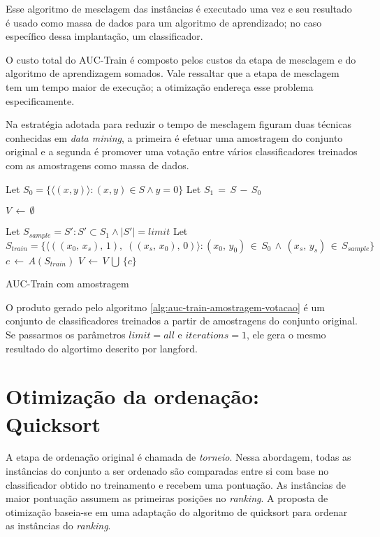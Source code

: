 Esse algoritmo de mesclagem das instâncias é executado uma vez e seu resultado é usado como massa de dados para um algoritmo de aprendizado; no caso específico dessa implantação, um classificador.

O custo total do AUC-Train é composto pelos custos da etapa de mesclagem e do algoritmo de aprendizagem somados. Vale ressaltar que a etapa de mesclagem tem um tempo maior de execução; a otimização endereça esse problema especificamente.

Na estratégia adotada para reduzir o tempo de mesclagem figuram duas técnicas conhecidas em \emph{data mining}, a primeira é efetuar uma amostragem do conjunto original e a segunda é promover uma votação entre vários classificadores treinados com as amostragens como massa de dados.

\begin{algorithm}
\begin{algorithmic}

\STATE Let $S_0 = \{\langle (x, y) \rangle: (x, y) \in S \wedge y = 0\}$
\STATE Let $S_1\,=\,S\,-\,S_0$

\STATE $V\,\gets\,\emptyset$

\STATE Let $S_{sample} = S' : S' \subset S_1 \wedge |S'| = limit$
\STATE Let $S_{train} = \{\langle ((x_{0},\,x_{s}),\, 1),\; ((x_{s},\, x_{0}),\,0) \rangle:
       (x_{0},\,y_{0})\,\in\,S_{0}\,\wedge\,
       (x_{s},\,y_{s})\,\in\,S_{sample}\}$
\STATE $c\,\gets\,A(S_{train})$
\STATE $V\,\gets\,V\,\bigcup\,\{c\}$
\ENDFOR

\caption{AUC-Train com amostragem}
\label{alg:auc-train-amostragem-votacao}

\end{algorithmic}
\end{algorithm}

O produto gerado pelo algoritmo \ref{alg:auc-train-amostragem-votacao} é um conjunto de classificadores treinados a partir de amostragens do conjunto original. Se passarmos os parâmetros $limit=all$ e $iterations=1$, ele gera o mesmo resultado do algortimo descrito por {{langford}}.


\section{Otimização da ordenação: Quicksort}
A etapa de ordenação original é chamada de \emph{torneio}. Nessa abordagem, todas as instâncias do conjunto a ser ordenado são comparadas entre si com base no classificador obtido no treinamento e recebem uma pontuação. As instâncias de maior pontuação assumem as primeiras posições no \emph{ranking}. A proposta de otimização baseia-se em uma adaptação do algoritmo de quicksort para ordenar as instâncias do \emph{ranking}.

